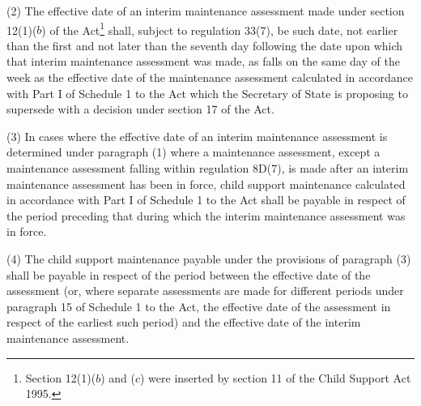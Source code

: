 \documentclass[a4paper,12pt]{article}
\begin{document}
(2) 
The effective date of an interim maintenance assessment made under section 12(1)($b$) of the Act\footnote{\frenchspacing Section 12(1)($b$) and ($c$) were inserted by section 11 of the Child Support Act 1995.} shall, subject to regulation 33(7),  %
be such date, not earlier than the first and not later than the seventh day following the date upon which that interim maintenance assessment was made, as falls on the same day of the week as the effective date of the maintenance assessment calculated in accordance with Part I of Schedule 1 to the Act which 
the Secretary of State is proposing to supersede with a decision under section 17 of the Act.  %

(3) In cases where the effective date of an interim maintenance assessment is determined under paragraph (1)
where a maintenance assessment, except a maintenance assessment falling within regulation 8D(7), is made after an interim maintenance assessment has been in force, child support maintenance calculated in accordance with Part I of Schedule 1 to the Act shall be payable in respect of the period preceding that during which the interim maintenance assessment was in force.

(4) The child support maintenance payable under the provisions of paragraph (3) shall be payable in respect of the period between the effective date of the assessment (or, where separate assessments are made for different periods under paragraph 15 of Schedule 1 to the Act, the effective date of the assessment in respect of the earliest such period) and the effective date of the interim maintenance assessment.

\end{document}
